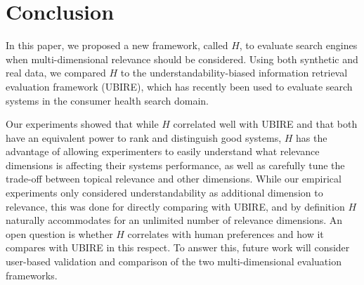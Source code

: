 
\section{Conclusion}
\label{sec:conclusion}

In this paper, we proposed a new framework, called $H$, to evaluate search engines when multi-dimensional relevance should be considered.
Using both synthetic and real data, we compared $H$ to the understandability-biased information retrieval evaluation framework (UBIRE), which has recently been used  to evaluate search systems in the consumer health search domain. 

Our experiments showed that while $H$ correlated well with UBIRE and that both have an equivalent power to rank and distinguish good systems, $H$ has the advantage of allowing experimenters to easily understand what relevance dimensions is affecting their systems performance, as well as carefully tune the trade-off between topical relevance and other dimensions. While our empirical experiments only considered understandability as additional dimension to relevance, this was done for directly comparing with UBIRE, and by definition $H$ naturally accommodates for an unlimited number of relevance dimensions. An open question is whether $H$ correlates with human preferences and how it compares with UBIRE in this respect. To answer this, future work will consider user-based validation and comparison of the two multi-dimensional evaluation frameworks. 
